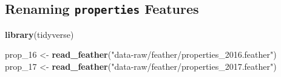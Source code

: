 \documentclass[]{book}
\newenvironment{Shaded}{\begin{snugshade}}{\end{snugshade}}
\newcommand{\KeywordTok}[1]{\textcolor[rgb]{0.13,0.29,0.53}{\textbf{#1}}}
\newcommand{\DecValTok}[1]{\textcolor[rgb]{0.00,0.00,0.81}{#1}}
\newcommand{\StringTok}[1]{\textcolor[rgb]{0.31,0.60,0.02}{#1}}
\newcommand{\NormalTok}[1]{#1}
\theoremstyle{definition}
\theoremstyle{definition}
\theoremstyle{definition}
\theoremstyle{remark}
\begin{document}
\subsection{\texorpdfstring{Renaming \texttt{properties}
Features}{Renaming properties Features}}\label{renaming-properties-features}

\begin{Shaded}
\begin{Highlighting}[]
\KeywordTok{library}\NormalTok{(tidyverse)}

\NormalTok{prop_}\DecValTok{16}\NormalTok{ <-}\StringTok{ }\KeywordTok{read_feather}\NormalTok{(}\StringTok{"data-raw/feather/properties_2016.feather"}\NormalTok{)}
\NormalTok{prop_}\DecValTok{17}\NormalTok{ <-}\StringTok{ }\KeywordTok{read_feather}\NormalTok{(}\StringTok{"data-raw/feather/properties_2017.feather"}\NormalTok{)}


\end{Highlighting}
\end{Shaded}
\end{document}
